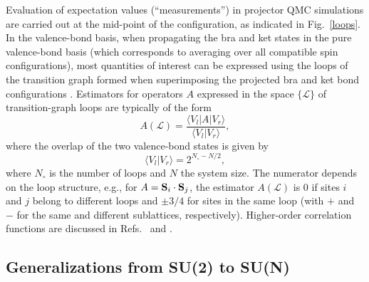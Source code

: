 \documentclass[range]{ar2e}
\begin{document}
Evaluation of expectation values (``measurements'') in projector QMC simulations are carried out at the mid-point of the configuration, as indicated 
in Fig.~\ref{loops}. In the valence-bond basis, when propagating the bra and ket states in the pure valence-bond basis (which corresponds to averaging 
over all compatible spin configurations), most quantities of interest can be expressed using the loops of the transition graph formed when superimposing 
the projected bra and ket bond configurations \cite{Liang88,Sutherland88}. Estimators for operators $A$ expressed in the space $\{\mathcal{L}\}$ of 
transition-graph loops are typically of the form
\begin{equation}
A(\mathcal{L}) = \frac{\langle V_l|A|V_r\rangle}{\langle V_l|V_r \rangle},
\label{aloop}
\end{equation}
where the overlap of the two valence-bond states is given by
\begin{equation}
\langle V_l|V_r\rangle = 2^{N_\circ - N/2},
\label{vboverlap}
\end{equation}
where $N_\circ$ is the number of loops and $N$ the system size. The numerator depends on the loop structure, e.g., for $A={\bf S}_i \cdot {\bf S}_j$,
the estimator $A(\mathcal{L})$ is $0$ if sites $i$ and $j$ belong to different loops and $\pm 3/4$ for sites in the same loop (with $+$ and $-$ for 
the same and different sublattices, respectively). Higher-order correlation functions are discussed in Refs.~\cite{Beach06} and \cite{Tang11b}.

\subsection {Generalizations from SU(2) to SU(N)}
\label{ss:su2N}
\end{document}
